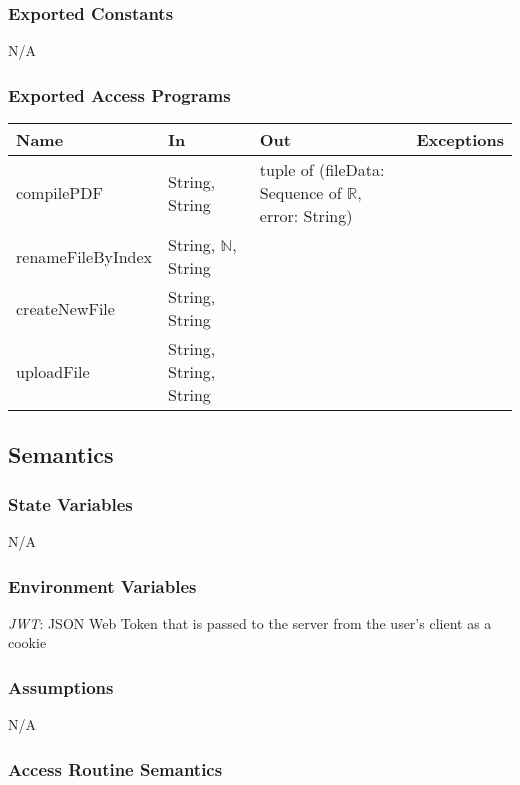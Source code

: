 \documentclass[12pt, titlepage]{article}
\begin{document}
	\subsubsection{Exported Constants}
	
	N/A
	
	\subsubsection{Exported Access Programs}
	
	\footnotesize\begin{center}
		\begin{tabular}{l  l  l  l}
			\hline
			\textbf{Name} & \textbf{In} & \textbf{Out} & \textbf{Exceptions} \\
			\hline
			compilePDF & String, String & tuple of (fileData: Sequence of $\mathbb{R}$, error: String) &  \\
			\hline
			renameFileByIndex & String, $\mathbb{N}$, String & & \\
			\hline
			createNewFile & String, String & & \\
			\hline
			uploadFile & String, String, String & & \\
			\hline
		\end{tabular}
	\end{center}
	\normalsize
	
	
	\subsection{Semantics}
	
	\subsubsection{State Variables}
	
	N/A
	
	\subsubsection{Environment Variables}
	
	\textit{JWT}: JSON Web Token that is passed to the server from the user's client as a cookie
	
	\subsubsection{Assumptions}
	
	N/A
	
	\subsubsection{Access Routine Semantics}
	
\end{document}
